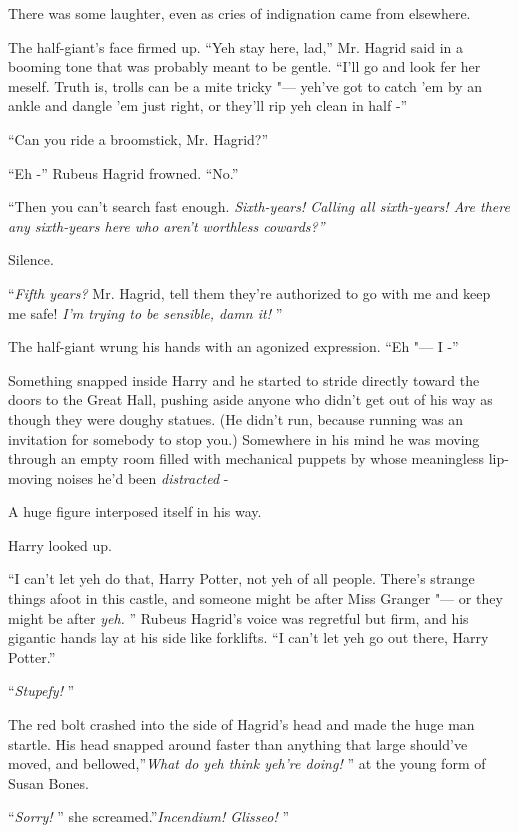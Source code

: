 There was some laughter, even as cries of indignation came from
elsewhere.

The half-giant's face firmed up. ``Yeh stay here, lad,'' Mr. Hagrid said
in a booming tone that was probably meant to be gentle. ``I'll go and
look fer her meself. Truth is, trolls can be a mite tricky "--- yeh've got
to catch 'em by an ankle and dangle 'em just right, or they'll rip yeh
clean in half -''

``Can you ride a broomstick, Mr. Hagrid?''

``Eh -'' Rubeus Hagrid frowned. ``No.''

``Then you can't search fast enough. \emph{Sixth-years! Calling all
sixth-years! Are there any sixth-years here who aren't worthless
cowards?''}

Silence.

``\emph{Fifth years?} Mr. Hagrid, tell them they're authorized to go with
me and keep me safe! \emph{I'm trying to be sensible, damn it!} ''

The half-giant wrung his hands with an agonized expression. ``Eh "--- I -''

Something snapped inside Harry and he started to stride directly toward
the doors to the Great Hall, pushing aside anyone who didn't get out of
his way as though they were doughy statues. (He didn't run, because
running was an invitation for somebody to stop you.) Somewhere in his
mind he was moving through an empty room filled with mechanical puppets
by whose meaningless lip-moving noises he'd been \emph{distracted} -

A huge figure interposed itself in his way.

Harry looked up.

``I can't let yeh do that, Harry Potter, not yeh of all people. There's
strange things afoot in this castle, and someone might be after Miss
Granger "--- or they might be after \emph{yeh.} '' Rubeus Hagrid's voice was
regretful but firm, and his gigantic hands lay at his side like
forklifts. ``I can't let yeh go out there, Harry Potter.''

``\emph{Stupefy!} ''

The red bolt crashed into the side of Hagrid's head and made the huge
man startle. His head snapped around faster than anything that large
should've moved, and bellowed,''\emph{What do yeh think yeh're doing!} ''
at the young form of Susan Bones.

``\emph{Sorry!} '' she screamed.''\emph{Incendium! Glisseo!} ''

